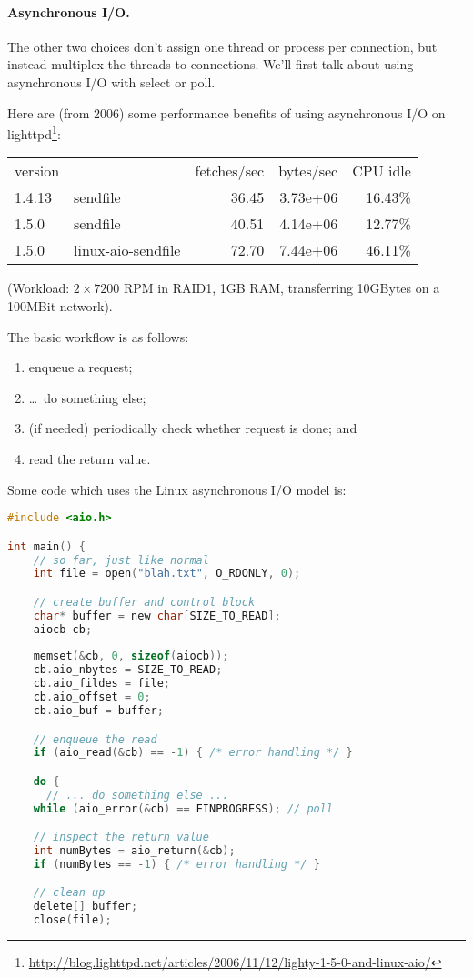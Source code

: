 \documentclass[11pt]{article}
\begin{document}
\paragraph{Asynchronous I/O.} The other two choices don't assign one thread or process per connection,
but instead multiplex the threads to connections. We'll first talk
about using asynchronous I/O with select or poll.  

Here are (from 2006) some performance benefits of using asynchronous
I/O on lighttpd\footnote{\tiny
  \url{http://blog.lighttpd.net/articles/2006/11/12/lighty-1-5-0-and-linux-aio/}}:

    \begin{tabular}{llrrr}
    version & & fetches/sec & bytes/sec & CPU idle \\
    1.4.13 & sendfile & 36.45 & 3.73e+06 & 16.43\% \\
    1.5.0 & sendfile & 40.51 & 4.14e+06 & 12.77\% \\
    1.5.0 & linux-aio-sendfile & 72.70 & 7.44e+06 & 46.11\% \\
    \end{tabular}

(Workload: $2\times 7200$ RPM in RAID1, 1GB RAM, transferring 10GBytes on a 100MBit network).

The basic workflow is as follows: 
   \begin{enumerate}
     \item enqueue a request;
     \item \ldots ~do something else;
     \item (if needed) periodically check whether request is done; and
     \item read the return value.
   \end{enumerate}

Some code which uses the Linux asynchronous I/O model is:
\begin{lstlisting}[language=C]
#include <aio.h>

int main() {
    // so far, just like normal
    int file = open("blah.txt", O_RDONLY, 0);

    // create buffer and control block
    char* buffer = new char[SIZE_TO_READ];
    aiocb cb;
    
    memset(&cb, 0, sizeof(aiocb));
    cb.aio_nbytes = SIZE_TO_READ;
    cb.aio_fildes = file;
    cb.aio_offset = 0;
    cb.aio_buf = buffer;

    // enqueue the read
    if (aio_read(&cb) == -1) { /* error handling */ }

    do {
      // ... do something else ...
    while (aio_error(&cb) == EINPROGRESS); // poll

    // inspect the return value
    int numBytes = aio_return(&cb);
    if (numBytes == -1) { /* error handling */ }

    // clean up
    delete[] buffer;
    close(file);
\end{lstlisting}
\end{document}
